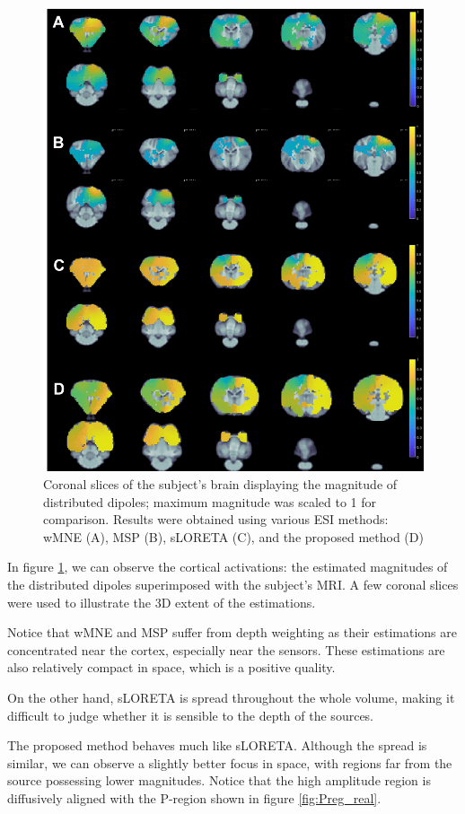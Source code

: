 \begin{figure}
\centering
\includegraphics[width=0.9\linewidth]{./img_dev2/real_comparison}
\caption{Coronal slices of the subject's brain displaying the magnitude of distributed dipoles; maximum magnitude was scaled to 1 for comparison.
%
Results were obtained using various ESI methods: wMNE (A), MSP (B), sLORETA (C), and the proposed method (D)}
\label{fig:real_comp}
\end{figure}

In figure \ref{fig:real_comp}, we can observe the cortical activations: the estimated magnitudes of the distributed dipoles superimposed with the subject's MRI.
% 
A few coronal slices were used to illustrate the 3D extent of the estimations.

Notice that wMNE and MSP suffer from depth weighting as their estimations are concentrated near the cortex, especially near the sensors.
%
These estimations are also relatively compact in space, which is a positive quality.

On the other hand, sLORETA is spread throughout the whole volume, making it difficult to judge whether it is sensible to the depth of the sources.

The proposed method behaves much like sLORETA.
%
Although the spread is similar, we can observe a slightly better focus in space, with regions far from the source possessing lower magnitudes.
%
Notice that the high amplitude region is diffusively aligned with the P-region shown in figure \ref{fig:Preg_real}.

